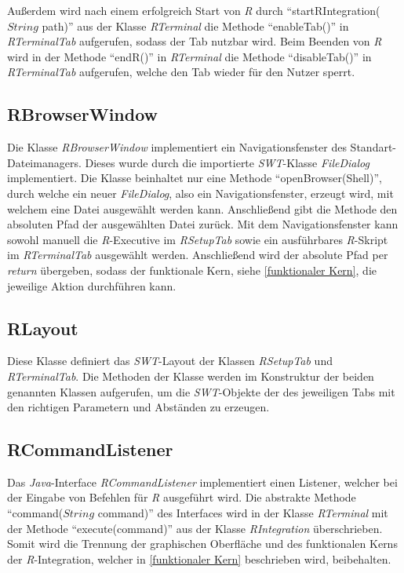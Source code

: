 \documentclass[a4paper, 12pt]{report} %
\begin{document}
Außerdem wird nach einem erfolgreich Start von \textit{R} durch "`startRIntegration($String$ path)"' aus der Klasse \textit{RTerminal}  die Methode "`enableTab()"' in \textit{RTerminalTab} aufgerufen, sodass der Tab nutzbar wird. Beim Beenden von \textit{R} wird in der Methode "`endR()"' in  \textit{RTerminal} die Methode "`disableTab()"' in \textit{RTerminalTab} aufgerufen, welche den Tab wieder für den Nutzer sperrt.

\subsection{RBrowserWindow} \label{RBrowserWindow} 

Die Klasse \textit{RBrowserWindow} implementiert ein Navigationsfenster des Standart-Dateimanagers. 
Dieses wurde durch die importierte \textit{SWT}-Klasse \textit{FileDialog} implementiert. Die Klasse beinhaltet nur eine Methode "`openBrowser(Shell)"', durch welche ein neuer \textit{FileDialog}, also ein Navigationsfenster, erzeugt wird, mit welchem eine Datei ausgewählt werden kann. Anschließend gibt die Methode den absoluten Pfad der ausgewählten Datei zurück. 
Mit dem Navigationsfenster kann sowohl manuell die \textit{R}-Executive im \textit{RSetupTab} sowie ein ausführbares \textit{R}-Skript im \textit{RTerminalTab} ausgewählt werden. Anschließend wird der absolute Pfad per \textit{return} übergeben, sodass der funktionale Kern, siehe \ref{funktionaler Kern}, die jeweilige Aktion durchführen kann.

\subsection{RLayout}

Diese Klasse definiert das \textit{SWT}-Layout der Klassen \textit{RSetupTab} und \textit{RTerminalTab}. 
Die Methoden der Klasse werden im Konstruktur der beiden genannten Klassen aufgerufen, um die \textit{SWT}-Objekte der des jeweiligen Tabs mit den richtigen Parametern und Abständen zu erzeugen.

\subsection{RCommandListener} \label{RCommandListener}

Das \textit{Java}-Interface \textit{RCommandListener} implementiert einen Listener, welcher bei der Eingabe von Befehlen für \textit{R} ausgeführt wird. Die abstrakte Methode "`command($String$ command)"' des Interfaces wird in der Klasse \textit{RTerminal} mit der Methode "`execute(command)"' aus der Klasse \textit{RIntegration} überschrieben. Somit wird die Trennung der graphischen Oberfläche und des funktionalen Kerns der \textit{R}-Integration, welcher in \ref{funktionaler Kern} beschrieben wird, beibehalten.
\end{document}
